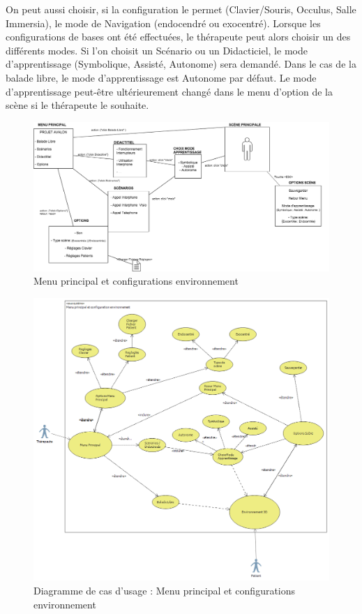 On peut aussi choisir, si la configuration le permet (Clavier/Souris, Occulus, Salle Immersia), le mode de Navigation (endocendré ou exocentré). 
\newline
Lorsque les configurations de bases ont été effectuées, le thérapeute peut alors choisir un des différents modes. Si l'on choisit un Scénario ou un Didacticiel, le mode d'apprentissage (Symbolique, Assisté, Autonome) sera demandé. Dans le cas de la balade libre, le mode d'apprentissage est Autonome par défaut. Le mode d'apprentissage peut-être ultérieurement changé dans le menu d'option de la scène si le thérapeute le souhaite. 
\newline

\begin{figure}[h]
\centering
\includegraphics[width=1\textwidth]{2-Specifications/img-utilisateur/menu.png}
\caption{\label{fig:Menu} Menu principal et configurations environnement }
\end{figure}
\begin{figure}[h]
\centering
\includegraphics[width=1\textwidth]{2-Specifications/img-utilisateur/cas-usage-menu.png}
\caption{\label{fig:CasUsageMenu} Diagramme de cas d'usage : Menu principal et configurations environnement }
\end{figure}
\FloatBarrier 



